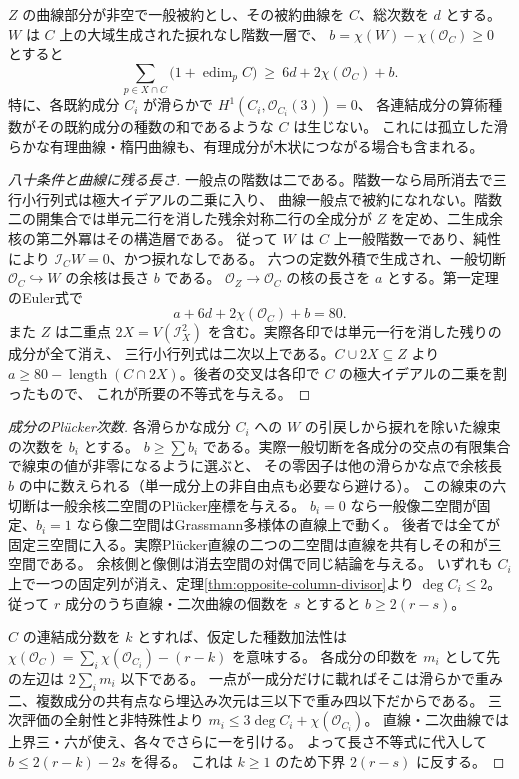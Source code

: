 \begin{theorem}\label{thm:generically-reduced-rank-two-curves}
$Z$ の曲線部分が非空で一般被約とし、その被約曲線を $C$、総次数を $d$ とする。
$W$ は $C$ 上の大域生成された捩れなし階数一層で、
$b=\chi(W)-\chi(\mathcal O_C)\ge0$ とすると
\[
  \sum_{p\in X\cap C}\bigl(1+\operatorname{edim}_p C\bigr)
               \ \ge\ 6d+2\chi(\mathcal O_C)+b .
\]
特に、各既約成分 $C_i$ が滑らかで $H^1(C_i,\mathcal O_{C_i}(3))=0$、
各連結成分の算術種数がその既約成分の種数の和であるような $C$ は生じない。
これには孤立した滑らかな有理曲線・楕円曲線も、有理成分が木状につながる場合も含まれる。
\end{theorem}
\begin{proof}[八十条件と曲線に残る長さ]
一般点の階数は二である。階数一なら局所消去で三行小行列式は極大イデアルの二乗に入り、
曲線一般点で被約になれない。階数二の開集合では単元二行を消した残余対称二行の全成分が
$Z$ を定め、二生成余核の第二外冪はその構造層である。
従って $W$ は $C$ 上一般階数一であり、純性により $\mathcal I_C W=0$、かつ捩れなしである。
六つの定数外積で生成され、一般切断 $\mathcal O_C\hookrightarrow W$ の余核は長さ $b$ である。
$\mathcal O_Z\to\mathcal O_C$ の核の長さを $a$ とする。第一定理のEuler式で
\[
                    a+6d+2\chi(\mathcal O_C)+b=80 .
\]
また $Z$ は二重点 $2X=V(\mathcal I_X^2)$ を含む。実際各印では単元一行を消した残りの成分が全て消え、
三行小行列式は二次以上である。$C\cup 2X\subseteq Z$ より
$a\ge80-\operatorname{length}(C\cap 2X)$。後者の交叉は各印で $C$ の極大イデアルの二乗を割ったもので、
これが所要の不等式を与える。
\end{proof}
\begin{proof}[成分のPlücker次数]
各滑らかな成分 $C_i$ への $W$ の引戻しから捩れを除いた線束の次数を $b_i$ とする。
$b\ge\sum b_i$ である。実際一般切断を各成分の交点の有限集合で線束の値が非零になるように選ぶと、
その零因子は他の滑らかな点で余核長 $b$ の中に数えられる（単一成分上の非自由点も必要なら避ける）。
この線束の六切断は一般余核二空間のPlücker座標を与える。
$b_i=0$ なら一般像二空間が固定、$b_i=1$ なら像二空間はGrassmann多様体の直線上で動く。
後者では全てが固定三空間に入る。実際Plücker直線の二つの二空間は直線を共有しその和が三空間である。
余核側と像側は消去空間の対偶で同じ結論を与える。
いずれも $C_i$ 上で一つの固定列が消え、定理\ref{thm:opposite-column-divisor}より $\deg C_i\le2$。
従って $r$ 成分のうち直線・二次曲線の個数を $s$ とすると $b\ge2(r-s)$。

$C$ の連結成分数を $k$ とすれば、仮定した種数加法性は
$\chi(\mathcal O_C)=\sum_i\chi(\mathcal O_{C_i})-(r-k)$ を意味する。
各成分の印数を $m_i$ として先の左辺は $2\sum_i m_i$ 以下である。
一点が一成分だけに載ればそこは滑らかで重み二、複数成分の共有点なら埋込み次元は三以下で重み四以下だからである。
三次評価の全射性と非特殊性より $m_i\le 3\deg C_i+\chi(\mathcal O_{C_i})$。
直線・二次曲線では上界三・六が使え、各々でさらに一を引ける。
よって長さ不等式に代入して $b\le 2(r-k)-2s$ を得る。
これは $k\ge1$ のため下界 $2(r-s)$ に反する。
\end{proof}

